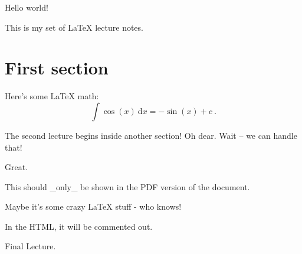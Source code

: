 Hello world!

This is my set of LaTeX lecture notes.

\section{First section}

Here's some LaTeX math:
$$
    \int \cos(x) ~ \mathrm{d} x = - \sin(x) + c~.
$$



The second lecture begins inside another section! Oh dear. Wait -- we can handle that!

Great.

This should _only_ be shown in the PDF version of the document.

Maybe it's some crazy LaTeX stuff - who knows!

In the HTML, it will be commented out.


Final Lecture.

